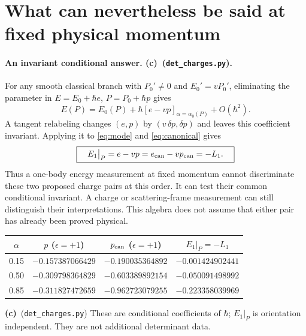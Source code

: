 \documentclass[11pt,a4paper]{article}
\newcommand{\Lc}{\textbf{(c)}}
\newcommand{\Ccheck}{\texttt{det\_charges.py}}
\begin{document}
\section{What can nevertheless be said at fixed physical momentum}
\paragraph{An invariant conditional answer. \Lc\ (\Ccheck).}
For any smooth classical branch with $P_0'\ne0$ and $E_0'=vP_0'$, eliminating
the parameter in $E=E_0+\hbar e$, $P=P_0+\hbar p$ gives
\begin{equation}
 E(P)=E_0(P)+\hbar[e-vp]_{\alpha=\alpha_0(P)}+O(\hbar^2).
\end{equation}
A tangent relabeling changes $(e,p)$ by $(v\,\delta p,\delta p)$ and leaves
this coefficient invariant. Applying it to \eqref{eq:mode} and
\eqref{eq:canonical} gives
\begin{equation}
 \boxed{\quad E_1\big|_P=e-vp=e_{\rm can}-vp_{\rm can}=-L_1.\quad}
 \label{eq:invariant}
\end{equation}
Thus a one-body energy measurement at fixed momentum cannot discriminate
these two proposed charge pairs at this order. It can test their common
conditional invariant. A charge or scattering-frame measurement can still
distinguish their interpretations. This algebra does not assume that either
pair has already been proved physical.

\begin{center}
\begin{tabular}{cccc}
\toprule
$\alpha$ & $p$ ($\epsilon=+1$) & $p_{\rm can}$ ($\epsilon=+1$) & $E_1|_P=-L_1$\\
\midrule
0.15 & $-0.157387066429$ & $-0.190035364892$ & $-0.001424902441$\\
0.50 & $-0.309798364829$ & $-0.603389892154$ & $-0.050091498992$\\
0.85 & $-0.311827472659$ & $-0.962723079255$ & $-0.223358039969$\\
\bottomrule
\end{tabular}
\end{center}
\Lc\ (\Ccheck) These are conditional coefficients of $\hbar$;
$E_1|_P$ is orientation independent. They are not additional determinant data.
\end{document}
